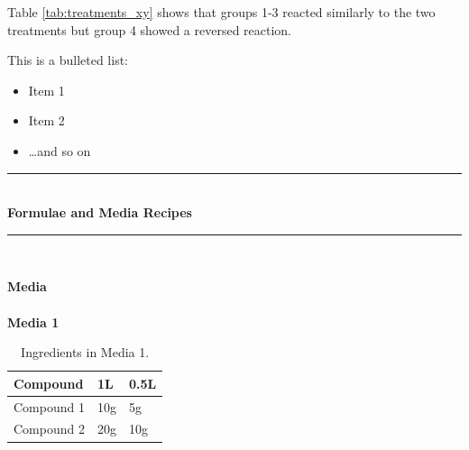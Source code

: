 \documentclass[idxtotoc,hyperref,openany]{labbook} %
\newcommand{\HRule}{\rule{\linewidth}{0.5mm}} %
\begin{document}
Table \ref{tab:treatments_xy} shows that groups 1-3 reacted similarly to the two treatments but group 4 showed a reversed reaction.




This is a bulleted list:

\begin{itemize}
\item Item 1
\item Item 2
\item \ldots and so on
\end{itemize}



\lipsum[6]



\lipsum[7]


\labday{} %

\begin{center}
\HRule \\[0.4cm]
{\huge \textbf{Formulae and Media Recipes}}\\[0.4cm] %
\HRule \\[1.5cm]
\end{center}


\newpage

\huge \textbf{Media} \\ \\

\normalsize \textbf{Media 1}\\
\begin{table}[H]
\begin{tabular}{l l l}
\toprule
\textbf{Compound} & \textbf{1L} & \textbf{0.5L}\\
\toprule
Compound 1 & 10g & 5g\\
Compound 2 & 20g & 10g\\
\bottomrule
\end{tabular}
\caption{Ingredients in Media 1.}
\label{tab:med1}
\end{table}
\end{document}
